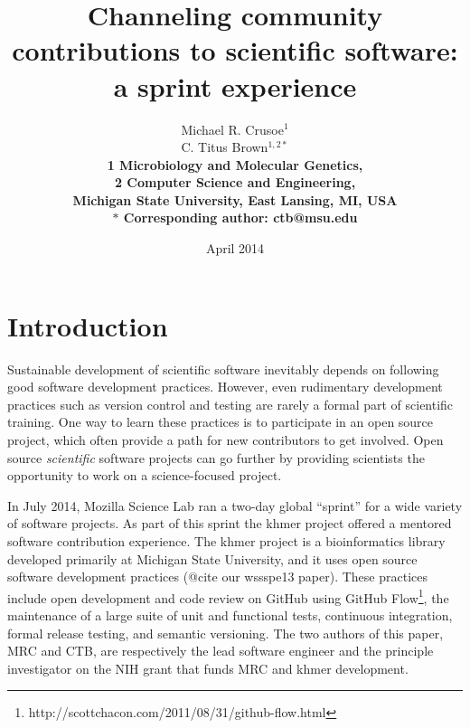 \documentclass[12pt]{article}
\date{April 2014}
\title{Channeling community contributions to scientific software: a sprint experience}
\author{Michael R. Crusoe$^{1}$\\
C. Titus Brown$^{1,2\ast}$\\
\small \bf{1} Microbiology and Molecular Genetics,\\
\small \bf{2} Computer Science and Engineering,\\
\small Michigan State University, East Lansing, MI, USA\\
\small $\ast$ Corresponding author: ctb@msu.edu}
\begin{document}
\maketitle
\thispagestyle{firststyle}


\setlength{\parindent}{0pt}
\setlength{\parindent}{0pt}
\setlength{\parskip}{0.70ex}

\section{Introduction}

Sustainable development of scientific software inevitably depends on
following good software development practices.  However, even
rudimentary development practices such as version control and testing
are rarely a formal part of scientific training.  One way to learn
these practices is to participate in an open source project, which
often provide a path for new contributors to get involved.  Open
source {\em scientific} software projects can go further by providing
scientists the opportunity to work on a science-focused project.

In July 2014, Mozilla Science Lab ran a two-day global ``sprint'' for
a wide variety of software projects. As part of this sprint the khmer
project offered a mentored software contribution experience.  The
khmer project is a bioinformatics library developed primarily at
Michigan State University, and it uses open source software
development practices (@cite our wssspe13 paper).  These practices
include open development and code review on GitHub using GitHub
Flow\footnote{http://scottchacon.com/2011/08/31/github-flow.html}, the
maintenance of a large suite of unit and functional tests, continuous
integration, formal release testing, and semantic versioning.  The two
authors of this paper, MRC and CTB, are respectively the lead software
engineer and the principle investigator on the NIH grant that funds
MRC and khmer development.
\end{document}
